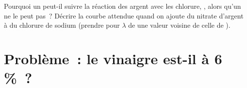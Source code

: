 \begin{exercise}[$\star\star\star$]\label{exo:g12:ph-conductivity-titrations:15}
Pourquoi un  peut-il suivre la réaction des 
argent avec les  chlorure, , alors qu'un
 ne le peut pas~? Décrire la courbe attendue quand on
ajoute du nitrate d'argent à du chlorure de sodium (prendre pour
$\lambda$ de  une valeur voisine de celle de
).
\end{exercise}

\section{Problème~: le vinaigre est-il à 6\,\%~?}

